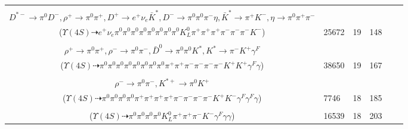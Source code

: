 \documentclass[landscape]{article}
\newcounter{rownumbers}
\newcommand\rn{\stepcounter{rownumbers}\arabic{rownumbers}}
\newcommand{\EOLP}{\\ \hline} %
\newcommand{\topoTags}[1]{#1} %
\begin{document}
\begin{longtable}{clcccc}
\rn & \makecell[l]{ $ 
\Upsilon(4S) \rightarrow B^{0} \bar{B}^{0} ,
B^{0} \rightarrow \pi^{-} a_{1}^{+} ,
\bar{B}^{0} \rightarrow \pi^{0} \bar{K}^{0} D^{*+} D^{*-} ,
a_{1}^{+} \rightarrow \pi^{0} \rho^{+} ,
\bar{K}^{0} \rightarrow K_{L}^{0} ,
D^{*+} \rightarrow \pi^{0} D^{+} ,
$ \\ $
D^{*-} \rightarrow \pi^{0} D^{-} ,
\rho^{+} \rightarrow \pi^{0} \pi^{+} ,
D^{+} \rightarrow e^{+} \nu_{e} \bar{K}^{*} ,
D^{-} \rightarrow \pi^{0} \pi^{0} \pi^{-} \eta ,
\bar{K}^{*} \rightarrow \pi^{+} K^{-} ,
\eta \rightarrow \pi^{0} \pi^{+} \pi^{-} 
$ \\ ($
\Upsilon(4S) \dashrightarrow e^{+} \nu_{e} \pi^{0} \pi^{0} \pi^{0} \pi^{0} \pi^{0} \pi^{0} \pi^{0} \pi^{0} K_{L}^{0} \pi^{+} \pi^{+} \pi^{+} \pi^{-} \pi^{-} \pi^{-} K^{-} 
$) } & \topoTags{25672 & }19 & 148 \EOLP

\rn & \makecell[l]{ $ 
\Upsilon(4S) \rightarrow B^{0} \bar{B}^{0} ,
B^{0} \rightarrow \pi^{0} \pi^{+} \eta K^{*} D^{*-} ,
\bar{B}^{0} \rightarrow \rho^{+} \rho^{-} \gamma ,
\eta \rightarrow \pi^{0} \pi^{0} \pi^{0} ,
K^{*} \rightarrow \pi^{-} K^{+} ,
D^{*-} \rightarrow \pi^{-} \bar{D}^{0} ,
$ \\ $
\rho^{+} \rightarrow \pi^{0} \pi^{+} ,
\rho^{-} \rightarrow \pi^{0} \pi^{-} ,
\bar{D}^{0} \rightarrow \pi^{0} \pi^{0} K^{*} ,
K^{*} \rightarrow \pi^{-} K^{+} \gamma^{F} 
$ \\ ($
\Upsilon(4S) \dashrightarrow \pi^{0} \pi^{0} \pi^{0} \pi^{0} \pi^{0} \pi^{0} \pi^{0} \pi^{0} \pi^{+} \pi^{+} \pi^{-} \pi^{-} \pi^{-} \pi^{-} K^{+} K^{+} \gamma^{F} \gamma 
$) } & \topoTags{38650 & }19 & 167 \EOLP

\rn & \makecell[l]{ $ 
\Upsilon(4S) \rightarrow B^{0} \bar{B}^{0} ,
B^{0} \rightarrow \pi^{+} \pi^{+} \pi^{-} \pi^{-} \omega \bar{D}^{0} ,
\bar{B}^{0} \rightarrow \rho^{+} K^{-} \gamma^{F} \gamma^{F} ,
\omega \rightarrow \pi^{0} \pi^{+} \pi^{-} ,
\bar{D}^{0} \rightarrow \rho^{-} K^{*+} \gamma ,
\rho^{+} \rightarrow \pi^{0} \pi^{+} ,
$ \\ $
\rho^{-} \rightarrow \pi^{0} \pi^{-} ,
K^{*+} \rightarrow \pi^{0} K^{+} 
$ \\ ($
\Upsilon(4S) \dashrightarrow \pi^{0} \pi^{0} \pi^{0} \pi^{0} \pi^{+} \pi^{+} \pi^{+} \pi^{+} \pi^{-} \pi^{-} \pi^{-} \pi^{-} K^{+} K^{-} \gamma^{F} \gamma^{F} \gamma 
$) } & \topoTags{7746 & }18 & 185 \EOLP

\rn & \makecell[l]{ $ 
\Upsilon(4S) \rightarrow B^{0} \bar{B}^{0} ,
B^{0} \rightarrow \pi^{0} \pi^{+} \eta D^{-} ,
\bar{B}^{0} \rightarrow \pi^{0} \pi^{0} \bar{K}_0^{*0} ,
\eta \rightarrow \gamma \gamma ,
D^{-} \rightarrow \pi^{0} K_{L}^{0} \pi^{-} \gamma^{F} ,
\bar{K}_0^{*0} \rightarrow \pi^{+} K^{-} 
$ \\ ($
\Upsilon(4S) \dashrightarrow \pi^{0} \pi^{0} \pi^{0} \pi^{0} K_{L}^{0} \pi^{+} \pi^{+} \pi^{-} K^{-} \gamma^{F} \gamma \gamma 
$) } & \topoTags{16539 & }18 & 203 \EOLP


\end{longtable}
\end{document}
